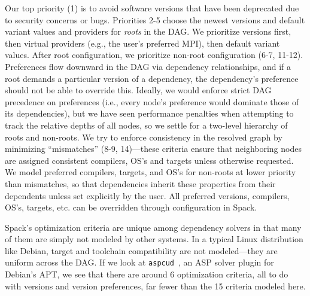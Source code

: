 Our top priority (1) is to avoid software versions that have been deprecated due to
security concerns or bugs. Priorities 2-5 choose the newest versions and default variant
values and providers for {\it roots} in the DAG. We prioritize versions first, then
virtual providers (e.g., the user's preferred MPI), then default variant values. After
root configuration, we prioritize non-root configuration (6-7, 11-12). Preferences flow
downward in the DAG via dependency relationships, and if a root demands a particular
version of a dependency, the dependency's preference should not be able to override
this. Ideally, we would enforce strict DAG precedence on preferences (i.e., every node's
preference would dominate those of its dependencies), but we have seen performance
penalties when attempting to track the relative depths of all nodes, so we settle for a
two-level hierarchy of roots and non-roots. We try to enforce consistency in the
resolved graph by minimizing ``mismatches'' (8-9, 14)---these criteria ensure that
neighboring nodes are assigned consistent compilers, OS's and targets unless otherwise
requested. We model preferred compilers, targets, and OS's for non-roots at lower
priority than mismatches, so that dependencies inherit these properties from their
dependents unless set explicitly by the user. All preferred versions, compilers, OS's,
targets, etc. can be overridden through configuration in Spack.

Spack's optimization criteria are unique among dependency solvers in that many of them
are simply not modeled by other systems. In a typical Linux distribution like Debian,
target and toolchain compatibility are not modeled---they are uniform across the DAG. If
we look at {\tt aspcud}~\cite{gebser+:2011-aspcud}, an ASP solver plugin for Debian's
APT, we see that there are around 6 optimization criteria, all to do with
versions and version preferences, far fewer than the 15 criteria modeled here.
